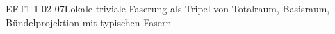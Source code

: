 
\begin{DEF}{EFT1-1-02-07}{Lokale triviale Faserung als Tripel von Totalraum, Basisraum, Bündelprojektion mit typischen Fasern}
\end{DEF}
